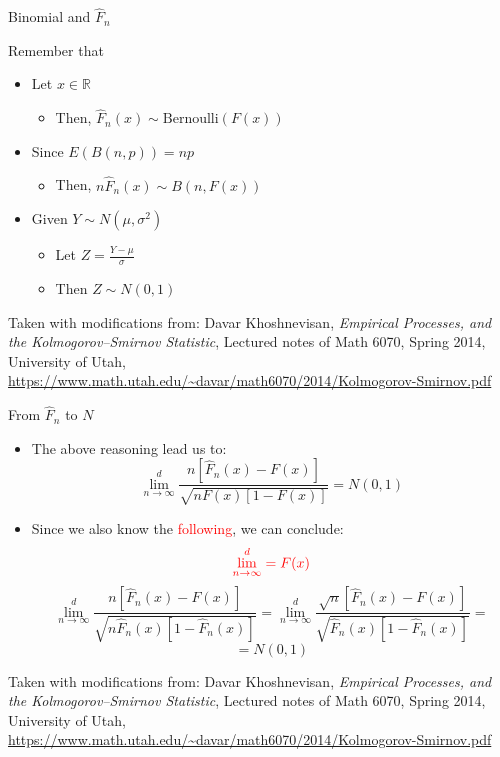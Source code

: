 \documentclass{beamer}
\begin{document}
\begin{frame}
{\centerline{Binomial and $\widehat {F}_{n}$}}
Remember that
\begin{itemize}
\item Let $x \in \mathbb{R}$
\begin{itemize}
\item Then, $ \widehat {F}_{n} (x) \sim \text{Bernoulli}(F(x))$
\end{itemize}
\item Since $E(B(n,p))=np$
\begin{itemize}
\item Then, $n \widehat {F}_{n} (x) \sim B(n,F(x))$
\end{itemize}
\item Given $Y \sim N(\mu,\sigma^2)$ 
\begin{itemize}
\item Let $ Z = \frac{Y - \mu}{\sigma}$
\item Then $Z \sim N(0,1)$
\end{itemize}

\end{itemize}

\begin{center}
\tiny{Taken with modifications from: Davar Khoshnevisan, \textit{Empirical Processes, and the Kolmogorov–Smirnov Statistic}, Lectured notes of Math 6070, Spring 2014, University of Utah, \url{https://www.math.utah.edu/~davar/math6070/2014/Kolmogorov-Smirnov.pdf}}
\end{center}

\end{frame}


\begin{frame}
{\centerline{From $\widehat {F}_{n}$ to $N$}}
\begin{itemize}
\item The above reasoning lead us to:
$$\lim_{n \to \infty}^{d} \frac{n \left [\widehat {F}_{n} (x) - F(x) \right ]}{\sqrt{nF(x)\left [ 1 - F(x) \right ]}} = N(0,1)$$
\item Since we also know the \textcolor{red}{following}, we can conclude:
$$ \textcolor{red}{\lim_{n \to \infty}^{d}  = F(x)} $$
 $$\lim_{n \to \infty}^{d} \frac{n \left [\widehat {F}_{n} (x) - F(x) \right ]}{\sqrt{n\widehat {F}_{n}(x)\left [ 1 - \widehat {F}_{n}(x) \right ]}} = 
 \lim_{n \to \infty}^{d} \frac{\sqrt{n} \left [\widehat {F}_{n} (x) - F(x) \right ]}{\sqrt{\widehat {F}_{n}(x)\left [ 1 - \widehat {F}_{n}(x) \right ]}} = $$
$$= N(0,1)$$


\end{itemize}

\begin{center}
\tiny{Taken with modifications from: Davar Khoshnevisan, \textit{Empirical Processes, and the Kolmogorov–Smirnov Statistic}, Lectured notes of Math 6070, Spring 2014, University of Utah, \url{https://www.math.utah.edu/~davar/math6070/2014/Kolmogorov-Smirnov.pdf}}
\end{center}

\end{frame}
\end{document}
